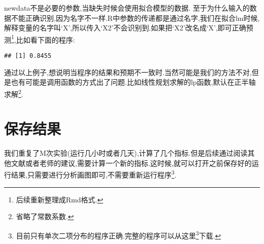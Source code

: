 \documentclass[]{ctexbook}
\newenvironment{Shaded}{\begin{snugshade}}{\end{snugshade}}
\newcommand{\DataTypeTok}[1]{\textcolor[rgb]{0.13,0.29,0.53}{#1}}
\newcommand{\DecValTok}[1]{\textcolor[rgb]{0.00,0.00,0.81}{#1}}
\newcommand{\FloatTok}[1]{\textcolor[rgb]{0.00,0.00,0.81}{#1}}
\newcommand{\KeywordTok}[1]{\textcolor[rgb]{0.13,0.29,0.53}{\textbf{#1}}}
\newcommand{\NormalTok}[1]{#1}
\newcommand{\OperatorTok}[1]{\textcolor[rgb]{0.81,0.36,0.00}{\textbf{#1}}}
\newcommand{\StringTok}[1]{\textcolor[rgb]{0.31,0.60,0.02}{#1}}
\renewcommand{\href}[2]{#2\footnote{\url{#1}}}
\begin{document}
newdata不是必要的参数,当缺失时候会使用拟合模型的数据.
至于为什么输入的数据不能正确识别,因为名字不一样.R中参数的传递都是通过名字,我们在拟合lm时候,解释变量的名字叫`X',所以传入`X2'不会识别到.如果把`X2'改名成`X',即可正确预测\footnote{后续重新整理成Rmd格式.},比如看下面的程序:

\begin{Shaded}
\end{Shaded}

\begin{verbatim}
## [1] 0.8455
\end{verbatim}

通过以上例子,想说明当程序的结果和预期不一致时.当然可能是我们的方法不对,但是也有可能是调用函数的方式出了问题.比如线性规划求解的lp函数,默认在正半轴求解\footnote{省略了常数系数.}.

\hypertarget{section-6}{%
\section{保存结果}\label{section-6}}

我们重复了M次实验(运行几小时或者几天),计算了几个指标.但是后续通过阅读其他文献或者老师的建议,需要计算一个新的指标.这时候,就可以打开之前保存好的运行结果,只需要进行分析画图即可,不需要重新运行程序\footnote{目前只有单次二项分布的程序正确.完整的程序可以从\href{code/glm.R}{这里}下载.}.
\end{document}
